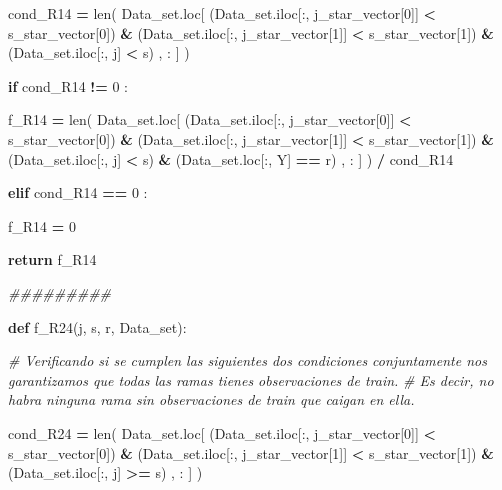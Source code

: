 \documentclass[
  11pt,
  a4paper,
]{article}
\newenvironment{Shaded}{\begin{snugshade}}{\end{snugshade}}
\newcommand{\BuiltInTok}[1]{#1}
\newcommand{\CommentTok}[1]{\textcolor[rgb]{0.56,0.35,0.01}{\textit{#1}}}
\newcommand{\ControlFlowTok}[1]{\textcolor[rgb]{0.13,0.29,0.53}{\textbf{#1}}}
\newcommand{\DecValTok}[1]{\textcolor[rgb]{0.00,0.00,0.81}{#1}}
\newcommand{\KeywordTok}[1]{\textcolor[rgb]{0.13,0.29,0.53}{\textbf{#1}}}
\newcommand{\NormalTok}[1]{#1}
\newcommand{\OperatorTok}[1]{\textcolor[rgb]{0.81,0.36,0.00}{\textbf{#1}}}
\newcommand{\StringTok}[1]{\textcolor[rgb]{0.31,0.60,0.02}{#1}}
\begin{document}
\begin{Shaded}
\begin{Highlighting}[]
\NormalTok{            cond\_R14 }\OperatorTok{=} \BuiltInTok{len}\NormalTok{( Data\_set.loc[ (Data\_set.iloc[:, j\_star\_vector[}\DecValTok{0}\NormalTok{]] }\OperatorTok{\textless{}}\NormalTok{ s\_star\_vector[}\DecValTok{0}\NormalTok{]) }\OperatorTok{\&}\NormalTok{ (Data\_set.iloc[:, j\_star\_vector[}\DecValTok{1}\NormalTok{]] }\OperatorTok{\textless{}}\NormalTok{ s\_star\_vector[}\DecValTok{1}\NormalTok{]) }\OperatorTok{\&}\NormalTok{ (Data\_set.iloc[:, j] }\OperatorTok{\textless{}}\NormalTok{ s) , : ] ) }

            \ControlFlowTok{if}\NormalTok{  cond\_R14 }\OperatorTok{!=} \DecValTok{0}\NormalTok{ :}

\NormalTok{                f\_R14 }\OperatorTok{=} \BuiltInTok{len}\NormalTok{( Data\_set.loc[ (Data\_set.iloc[:, j\_star\_vector[}\DecValTok{0}\NormalTok{]] }\OperatorTok{\textless{}}\NormalTok{ s\_star\_vector[}\DecValTok{0}\NormalTok{]) }\OperatorTok{\&}\NormalTok{ (Data\_set.iloc[:, j\_star\_vector[}\DecValTok{1}\NormalTok{]] }\OperatorTok{\textless{}}\NormalTok{ s\_star\_vector[}\DecValTok{1}\NormalTok{]) }\OperatorTok{\&}\NormalTok{ (Data\_set.iloc[:, j] }\OperatorTok{\textless{}}\NormalTok{ s) }\OperatorTok{\&}\NormalTok{ (Data\_set.loc[:, }\StringTok{\textquotesingle{}Y\textquotesingle{}}\NormalTok{] }\OperatorTok{==}\NormalTok{ r) , : ] ) }\OperatorTok{/}\NormalTok{ cond\_R14}

            
            \ControlFlowTok{elif}\NormalTok{ cond\_R14 }\OperatorTok{==} \DecValTok{0}\NormalTok{ :}

\NormalTok{                f\_R14 }\OperatorTok{=} \DecValTok{0}

            
            \ControlFlowTok{return}\NormalTok{ f\_R14 }

        \CommentTok{\#\#\#\#\#\#\#\#\#}

        \KeywordTok{def}\NormalTok{ f\_R24(j, s, r, Data\_set):}

           \CommentTok{\# Verificando si se cumplen las siguientes dos condiciones conjuntamente nos garantizamos que todas las ramas tienes observaciones de train. }
           \CommentTok{\# Es decir, no habra ninguna rama sin observaciones de train que caigan en ella.}

\NormalTok{            cond\_R24 }\OperatorTok{=} \BuiltInTok{len}\NormalTok{( Data\_set.loc[ (Data\_set.iloc[:, j\_star\_vector[}\DecValTok{0}\NormalTok{]] }\OperatorTok{\textless{}}\NormalTok{ s\_star\_vector[}\DecValTok{0}\NormalTok{]) }\OperatorTok{\&}\NormalTok{ (Data\_set.iloc[:, j\_star\_vector[}\DecValTok{1}\NormalTok{]] }\OperatorTok{\textless{}}\NormalTok{ s\_star\_vector[}\DecValTok{1}\NormalTok{]) }\OperatorTok{\&}\NormalTok{ (Data\_set.iloc[:, j] }\OperatorTok{\textgreater{}=}\NormalTok{ s) , : ] ) }


\end{Highlighting}
\end{Shaded}
\end{document}
